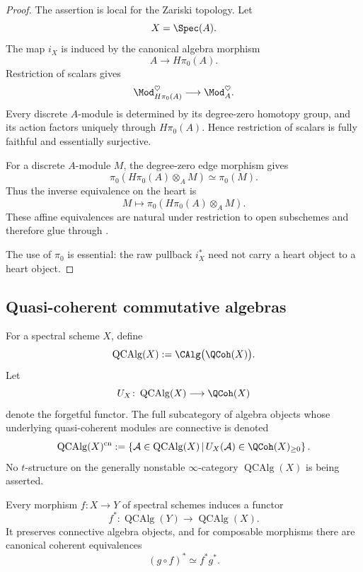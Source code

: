 \begin{proof}
The assertion is local for the Zariski topology. Let
\[
    X=\Spec(A).
\]
The map $i_X$ is induced by the canonical algebra morphism
\[
    A
    \longrightarrow
    H\pi_0(A).
\]
Restriction of scalars gives
\[
    \Mod_{H\pi_0(A)}^\heartsuit
    \longrightarrow
    \Mod_A^\heartsuit.
\]
Every discrete $A$-module is determined by its degree-zero homotopy group,
and its action factors uniquely through $H\pi_0(A)$. Hence restriction of
scalars is fully faithful and essentially surjective.

For a discrete $A$-module $M$, the degree-zero edge morphism gives
\[
    \pi_0
    \left(
        H\pi_0(A)\otimes_AM
    \right)
    \simeq
    \pi_0(M).
\]
Thus the inverse equivalence on the heart is
\[
    M
    \longmapsto
    \pi_0
    \left(
        H\pi_0(A)\otimes_AM
    \right).
\]
These affine equivalences are natural under restriction to open
subschemes and therefore glue through
.

The use of $\pi_0$ is essential: the raw pullback $i_X^*$ need not carry a
heart object to a heart object.
\end{proof}

\subsection{Quasi-coherent commutative algebras}

\begin{definition}
\label{def:quasi-coherent-commutative-algebra}
For a spectral scheme \(X\), define
\[
    \operatorname{QCAlg}(X)
    :=
    \CAlg\bigl(\QCoh(X)\bigr).
\]
Let
\[
    U_X
    \colon
    \operatorname{QCAlg}(X)
    \longrightarrow
    \QCoh(X)
\]
denote the forgetful functor. The full subcategory of algebra objects
whose underlying quasi-coherent modules are connective is denoted
\[
    \operatorname{QCAlg}(X)^{\mathrm{cn}}
    :=
    \left\{
        \mathcal A
        \in
        \operatorname{QCAlg}(X)
        \,\middle|\,
        U_X(\mathcal A)
        \in
        \QCoh(X)_{\geq0}
    \right\}.
\]
No \(t\)-structure on the generally nonstable
\(\infty\)-category \(\operatorname{QCAlg}(X)\) is being asserted.
\end{definition}

\begin{proposition}
\label{prop:pullback-qcalg}
Every morphism $f:X\to Y$ of spectral schemes induces a functor
\[
    f^*
    \colon
    \operatorname{QCAlg}(Y)
    \longrightarrow
    \operatorname{QCAlg}(X).
\]
It preserves connective algebra objects, and for composable morphisms
there are canonical coherent equivalences
\[
    (g\circ f)^*
    \simeq
    f^*g^*.
\]
\end{proposition}

